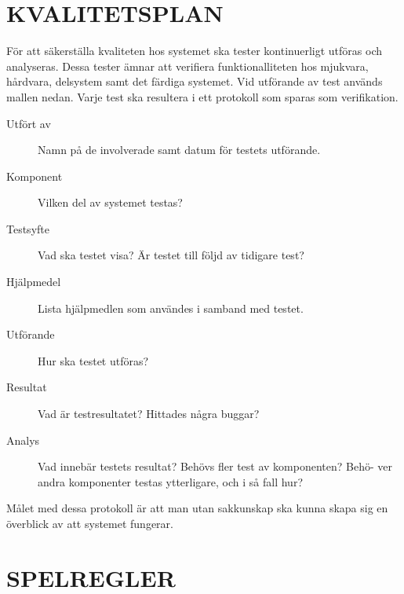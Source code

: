 \documentclass[a4paper]{article}
\begin{document}
\section{KVALITETSPLAN}
\label{sec:kval}

För att säkerställa kvaliteten hos systemet ska tester kontinuerligt utföras och analyseras. Dessa tester ämnar att verifiera funktionalliteten hos mjukvara, hårdvara, delsystem samt det färdiga systemet. Vid utförande av test används mallen nedan. Varje test ska resultera i ett protokoll som sparas som verifikation.

\begin{description}
	\item[Utfört av] Namn på de involverade samt datum för testets utförande.

	\item[Komponent] Vilken del av systemet testas?

	\item[Testsyfte] Vad ska testet visa? Är testet till följd av tidigare test?

	\item[Hjälpmedel] Lista hjälpmedlen som användes i samband med testet.

	\item[Utförande] Hur ska testet utföras?

	\item[Resultat] Vad är testresultatet? Hittades några buggar?

	\item[Analys] Vad innebär testets resultat? Behövs fler test av komponenten? Behö-
	ver andra komponenter testas ytterligare, och i så fall hur?
\end{description}

Målet med dessa protokoll är att man utan sakkunskap ska kunna skapa sig en överblick av att systemet fungerar.

\section{SPELREGLER}
\label{sec:spelregler}
\end{document}

